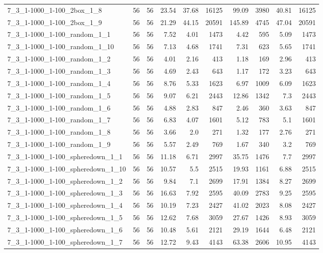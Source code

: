 \begin{center}
\begin{scriptsize}
\begin{longtable}{lrrrrrrrrr}
7\_3\_1-1000\_1-100\_2box\_1\_8 & 56 & 56 & 23.54 & 37.68 & 16125 & 99.09 & 3980 & 40.81 & 16125\\
7\_3\_1-1000\_1-100\_2box\_1\_9 & 56 & 56 & 21.29 & 44.15 & 20591 & 145.89 & 4745 & 47.04 & 20591\\
7\_3\_1-1000\_1-100\_random\_1\_1 & 56 & 56 & 7.52 & 4.01 & 1473 & 4.42 & 595 & 5.09 & 1473\\
7\_3\_1-1000\_1-100\_random\_1\_10 & 56 & 56 & 7.13 & 4.68 & 1741 & 7.31 & 623 & 5.65 & 1741\\
7\_3\_1-1000\_1-100\_random\_1\_2 & 56 & 56 & 4.01 & 2.16 & 413 & 1.18 & 169 & 2.96 & 413\\
7\_3\_1-1000\_1-100\_random\_1\_3 & 56 & 56 & 4.69 & 2.43 & 643 & 1.17 & 172 & 3.23 & 643\\
7\_3\_1-1000\_1-100\_random\_1\_4 & 56 & 56 & 8.76 & 5.33 & 1623 & 6.97 & 1009 & 6.09 & 1623\\
7\_3\_1-1000\_1-100\_random\_1\_5 & 56 & 56 & 9.07 & 6.21 & 2443 & 12.86 & 1342 & 7.3 & 2443\\
7\_3\_1-1000\_1-100\_random\_1\_6 & 56 & 56 & 4.88 & 2.83 & 847 & 2.46 & 360 & 3.63 & 847\\
7\_3\_1-1000\_1-100\_random\_1\_7 & 56 & 56 & 6.83 & 4.07 & 1601 & 5.12 & 783 & 5.1 & 1601\\
7\_3\_1-1000\_1-100\_random\_1\_8 & 56 & 56 & 3.66 & 2.0 & 271 & 1.32 & 177 & 2.76 & 271\\
7\_3\_1-1000\_1-100\_random\_1\_9 & 56 & 56 & 5.57 & 2.49 & 769 & 1.67 & 340 & 3.2 & 769\\
7\_3\_1-1000\_1-100\_spheredown\_1\_1 & 56 & 56 & 11.18 & 6.71 & 2997 & 35.75 & 1476 & 7.7 & 2997\\
7\_3\_1-1000\_1-100\_spheredown\_1\_10 & 56 & 56 & 10.57 & 5.5 & 2515 & 19.93 & 1161 & 6.88 & 2515\\
7\_3\_1-1000\_1-100\_spheredown\_1\_2 & 56 & 56 & 9.84 & 7.1 & 2699 & 17.91 & 1384 & 8.27 & 2699\\
7\_3\_1-1000\_1-100\_spheredown\_1\_3 & 56 & 56 & 16.63 & 7.92 & 2595 & 40.09 & 2783 & 9.25 & 2595\\
7\_3\_1-1000\_1-100\_spheredown\_1\_4 & 56 & 56 & 10.19 & 7.23 & 2427 & 41.02 & 2023 & 8.08 & 2427\\
7\_3\_1-1000\_1-100\_spheredown\_1\_5 & 56 & 56 & 12.62 & 7.68 & 3059 & 27.67 & 1426 & 8.93 & 3059\\
7\_3\_1-1000\_1-100\_spheredown\_1\_6 & 56 & 56 & 10.48 & 5.61 & 2121 & 29.19 & 1644 & 6.48 & 2121\\
7\_3\_1-1000\_1-100\_spheredown\_1\_7 & 56 & 56 & 12.72 & 9.43 & 4143 & 63.38 & 2606 & 10.95 & 4143\\

\end{longtable}
\end{scriptsize}
\end{center}
